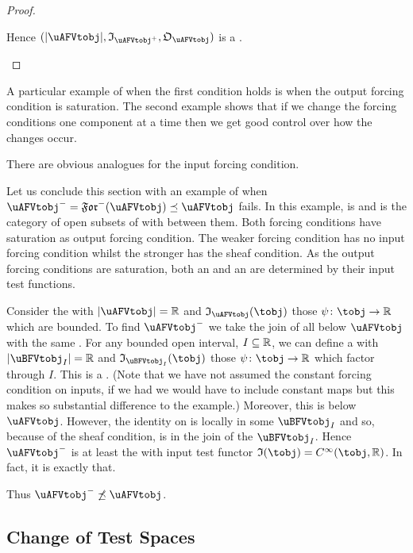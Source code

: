 \documentclass[%
12pt,%
arxiv,%
defaults
]{myclass}
\begin{document}
\begin{proof}
\begin{enumerate}
Hence \((\forfunc[\uAFVtobj], \itest_{\mMo{\uAFVtobj}}, \otest_{\uAFVtobj})\) is a \uBFVtobjalt. \qedhere
\end{enumerate}
\end{proof}

A particular example of when the first condition holds is when the output forcing condition is saturation.
The second example shows that if we change the forcing conditions one component at a time then we get good control over how the changes occur.

There are obvious analogues for the input forcing condition.

Let us conclude this section with an example of when \(\mJo{\uAFVtobj} = \Jforfunc(\uAFVtobj) \preceq \uAFVtobj\) fails.
In this example, \ucat is \xcat and \tcat is the category of open subsets of \R with \cimaps between them.
Both forcing conditions have saturation as output forcing condition.
The weaker forcing condition has no input forcing condition whilst the stronger has the sheaf condition.
As the output forcing conditions are saturation, both an \uAFVtobjalt and an \uBFVtobjalt are determined by their input test functions.

Consider the \uAFVtobjalt[\uAFVtobj] with \(\forfunc[\uAFVtobj] = \R\) and \(\itest_{\uAFVtobj}(\tobj)\) those \cimaps \(\ifn \colon \tobj \to \R\) which are bounded.
To find \(\mJo{\uAFVtobj}\) we take the join of all \uBFVtobjalts below \(\uAFVtobj\) with the same \uobj.
For any bounded open interval, \(I \subseteq \mathbb{R}\), we can define a \uBFVtobjalt[\uBFVtobj_I] with \(\forfunc[\uBFVtobj_I] = \R\) and \(\itest_{\uBFVtobj_I}(\tobj)\) those \cimaps \(\ifn \colon \tobj \to \R\) which factor through \(I\).
This is a \uBFVtobjalt.
(Note that we have not assumed the constant forcing condition on inputs, if we had we would have to include constant maps but this makes so substantial difference to the example.)
Moreover, this \uBFVtobjalt is below \(\uAFVtobj\).
However, the identity on \R is locally in some \(\uBFVtobj_I\) and so, because of the sheaf condition, is in the join of the \(\uBFVtobj_I\).
Hence \(\mJo{\uAFVtobj}\) is at least the \uBFVtobjalt with input test functor \(\itest(\tobj) = \Ci(\tobj,\R)\).
In fact, it is exactly that.

Thus \(\mJo{\uAFVtobj} \not\preceq \uAFVtobj\).



\subsection{Change of Test Spaces}
\end{document}
